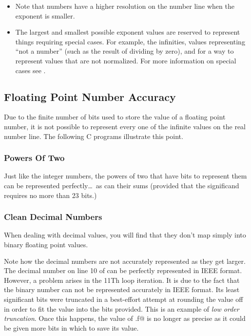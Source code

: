 \begin{itemize}
\item Note that numbers have a higher resolution on the number line when the 
exponent is smaller.

\item The largest and smallest possible exponent values are reserved to represent
things requiring special cases. For example, the infinities, values representing
``not a number'' (such as the result of dividing by zero), and for a way to represent
values that are not normalized. For more information on special cases see \cite{ieee:754}.

\end{itemize}

\subsection{Floating Point Number Accuracy}
Due to the finite number of bits used to store the value of a floating point
number, it is not possible to represent every one of the infinite values
on the real number line.  The following C programs illustrate this point.

\subsubsection{Powers Of Two}
Just like the integer numbers, the powers of two that have bits to represent 
them can be represented perfectly\ldots\ as can their sums (provided that the
significand requires no more than 23 bits.)


\subsubsection{Clean Decimal Numbers}
When dealing with decimal values, you will find that they don't map simply
into binary floating point values.

Note how the decimal numbers are not accurately represented as they get larger.
The decimal number on line 10 of 
can be perfectly represented in IEEE format.  However, a problem arises in 
the 11Th loop iteration.  It is due to the fact that the
binary number can not be represented accurately in IEEE format.  Its least
significant bits were truncated in a best-effort attempt at rounding the value
off in order to fit the value into the bits provided.  This is an example of
{\em low order truncation}.  Once this happens, the value of \verb@x.f@ is
no longer as precise as it could be given more bits in which to save its value.

